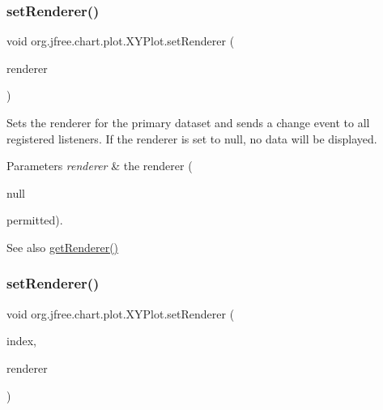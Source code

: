 \subsubsection{\texorpdfstring{set\+Renderer()}{setRenderer()}\hspace{0.1cm}{\footnotesize\ttfamily [1/3]}}
{\footnotesize\ttfamily void org.\+jfree.\+chart.\+plot.\+X\+Y\+Plot.\+set\+Renderer (\begin{DoxyParamCaption}\item[{\mbox{\hyperlink{interfaceorg_1_1jfree_1_1chart_1_1renderer_1_1xy_1_1_x_y_item_renderer}{X\+Y\+Item\+Renderer}}}]{renderer }\end{DoxyParamCaption})}

Sets the renderer for the primary dataset and sends a change event to all registered listeners. If the renderer is set to {\ttfamily null}, no data will be displayed.


\begin{DoxyParams}{Parameters}
{\em renderer} & the renderer (
\begin{DoxyCode}
null 
\end{DoxyCode}
 permitted).\\
\hline
\end{DoxyParams}
\begin{DoxySeeAlso}{See also}
\mbox{\hyperlink{classorg_1_1jfree_1_1chart_1_1plot_1_1_x_y_plot_adc261f128f1d00b8f474abc90075bf5d}{get\+Renderer()}} 
\end{DoxySeeAlso}
\mbox{\label{classorg_1_1jfree_1_1chart_1_1plot_1_1_x_y_plot_a9168d5fc85bd04d15231042574e98285}} 
\subsubsection{\texorpdfstring{set\+Renderer()}{setRenderer()}\hspace{0.1cm}{\footnotesize\ttfamily [2/3]}}
{\footnotesize\ttfamily void org.\+jfree.\+chart.\+plot.\+X\+Y\+Plot.\+set\+Renderer (\begin{DoxyParamCaption}\item[{int}]{index,  }\item[{\mbox{\hyperlink{interfaceorg_1_1jfree_1_1chart_1_1renderer_1_1xy_1_1_x_y_item_renderer}{X\+Y\+Item\+Renderer}}}]{renderer }\end{DoxyParamCaption})}

